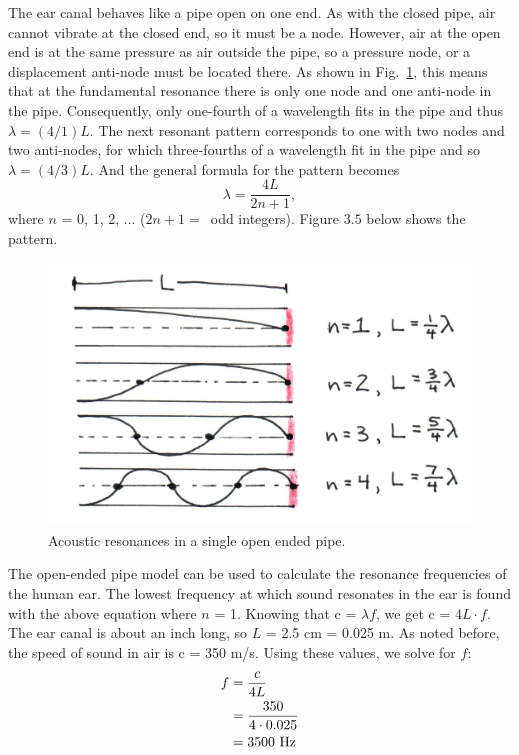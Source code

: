 The ear canal behaves like a pipe open on one end.  As with the closed pipe, air cannot vibrate at the closed end, so it must be a node.  However, air at the open end is at the same pressure as air outside the pipe, so a pressure node, or a displacement anti-node must be located there.  As shown in Fig.~\ref{Fig3-4}, this means that at the fundamental resonance there is only one node and one anti-node in the pipe. Consequently, only one-fourth of a wavelength fits in the pipe and thus $\lambda = (4/1)L$.  The next resonant pattern corresponds to one with two nodes and two anti-nodes, for which three-fourths of a wavelength fit in the pipe and so $\lambda = (4/3)L$. And the general formula for the pattern becomes 
\begin{equation}\label{eqn3-8}
\lambda = \frac{4L}{2n+1},
\end{equation}
where $n$ = 0, 1, 2, ... ($2n+1 = $~odd integers). Figure $3.5$ below shows the pattern.
\begin{figure}[htb]
	\centering
	\includegraphics[width=\textwidth]{./figures/Topic3/Fig3-4.jpg}
	\caption{Acoustic resonances in a single open ended pipe.}
	\label{Fig3-4}
\end{figure}
The open-ended pipe model can be used to calculate the resonance frequencies of the human ear.  The lowest frequency at which sound resonates in the ear is found with the above equation where $n$ = 1.  Knowing that c = $\lambda f$, we get c = $4L \cdot f$.  The ear canal is about an inch long, so $L$ = 2.5 cm = 0.025 m.  As noted before, the speed of sound in air is c = 350 m/s.  Using these values, we solve for $f$:
\begin{align}
f &= \frac{c}{4L}\nonumber\\
  &= \frac{350}{4\cdot 0.025}\nonumber\\
  &= 3500~{\rm Hz}\nonumber
\end{align}
